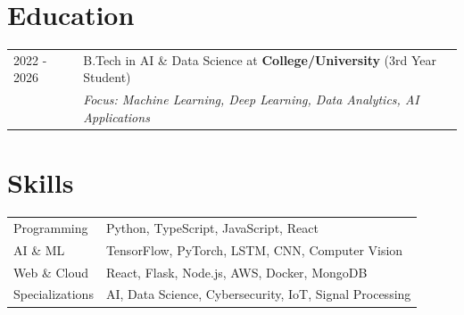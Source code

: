 \documentclass[a4paper,12pt]{article}
\begin{document}
\section{Education}
\begin{tabularx}{\linewidth}{@{}l X@{}}	
2022 - 2026 & B.Tech in AI \& Data Science at \textbf{College/University} \hfill \normalsize (3rd Year Student) \\
& \textit{Focus: Machine Learning, Deep Learning, Data Analytics, AI Applications} \\
\end{tabularx}

\section{Skills}
\begin{tabularx}{\linewidth}{@{}l X@{}}
Programming &  \normalsize{Python, TypeScript, JavaScript, React}\\
AI \& ML &  \normalsize{TensorFlow, PyTorch, LSTM, CNN, Computer Vision}\\
Web \& Cloud &  \normalsize{React, Flask, Node.js, AWS, Docker, MongoDB}\\
Specializations &  \normalsize{AI, Data Science, Cybersecurity, IoT, Signal Processing}\\
\end{tabularx}

\end{document}
